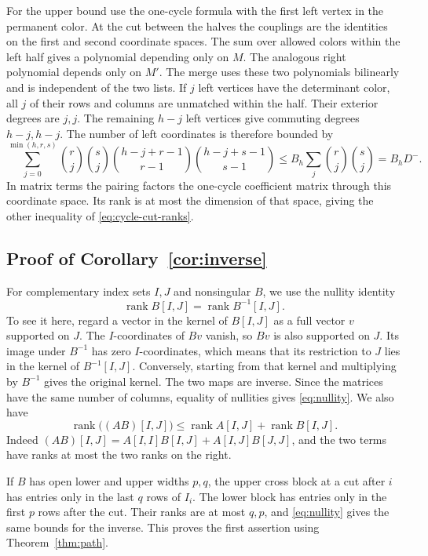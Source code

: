 \documentclass[11pt,reqno]{amsart}
\theoremstyle{remark}
\numberwithin{equation}{section}
\newcommand{\rk}{\operatorname{rank}}
\begin{document}
For the upper bound use the one-cycle formula with the first left vertex
in the permanent color. At the cut between the halves the couplings are
the identities on the first and second coordinate spaces. The sum over
allowed colors within the left half gives a polynomial depending only on
\(M\). The analogous right polynomial depends only on \(M'\). The merge
uses these two polynomials bilinearly and is independent of the two
lists. If \(j\) left vertices have the determinant color, all \(j\) of
their rows and columns are unmatched within the half. Their exterior
degrees are \(j,j\). The remaining \(h-j\) left vertices give commuting
degrees \(h-j,h-j\). The number of left coordinates is therefore bounded
by
\[
 \sum_{j=0}^{\min(h,r,s)}
 \binom rj\binom sj
 \binom{h-j+r-1}{r-1}\binom{h-j+s-1}{s-1}
 \leq B_h\sum_j\binom rj\binom sj
 =B_hD^-.
\]
In matrix terms the pairing factors the one-cycle coefficient matrix
through this coordinate space. Its rank is at most the dimension of that
space, giving the other inequality of \eqref{eq:cycle-cut-ranks}.

\subsection{Proof of Corollary~\ref{cor:inverse}}

For complementary index sets \(I,J\) and nonsingular \(B\), we use the
nullity identity \cite{StrangNguyen}
\begin{equation}\label{eq:nullity}
 \rk B[I,J]=\rk B^{-1}[I,J].
\end{equation}
To see it here, regard a vector in the kernel of \(B[I,J]\) as a full
vector \(v\) supported on \(J\). The \(I\)-coordinates of \(Bv\) vanish,
so \(Bv\) is also supported on \(J\). Its image under \(B^{-1}\) has zero
\(I\)-coordinates, which means that its restriction to \(J\) lies in the
kernel of \(B^{-1}[I,J]\). Conversely, starting from that kernel and
multiplying by \(B^{-1}\) gives the original kernel. The two maps are
inverse. Since the matrices have the same number of columns, equality of
nullities gives \eqref{eq:nullity}. We also have
\begin{equation}\label{eq:subadd}
 \rk\big((AB)[I,J]\big)\leq \rk A[I,J]+\rk B[I,J].
\end{equation}
Indeed \((AB)[I,J]=A[I,I]B[I,J]+A[I,J]B[J,J]\), and the two terms have
ranks at most the two ranks on the right.

If \(B\) has open lower and upper widths \(p,q\), the upper cross block
at a cut after \(i\) has entries only in the last \(q\) rows of \(I_i\).
The lower block has entries only in the first \(p\) rows after the cut.
Their ranks are at most \(q,p\), and \eqref{eq:nullity} gives the same
bounds for the inverse. This proves the first assertion using
Theorem~\ref{thm:path}.
\end{document}
